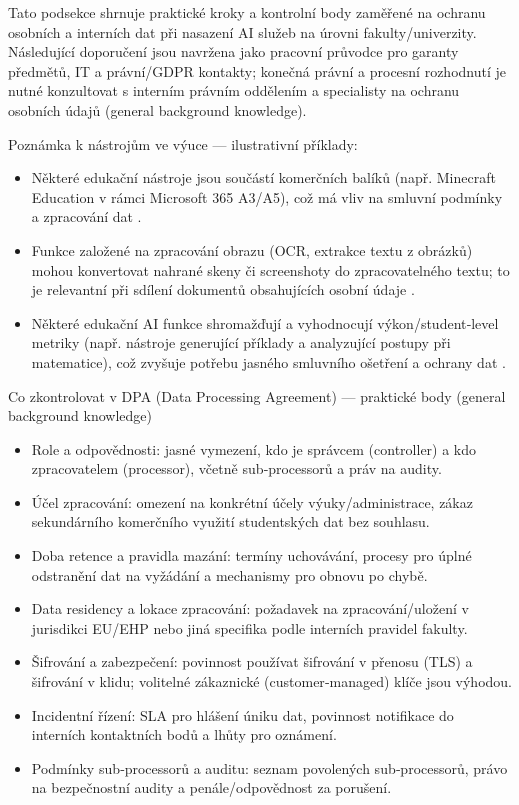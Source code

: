 Tato podsekce shrnuje praktické kroky a kontrolní body zaměřené na ochranu osobních a interních dat při nasazení AI služeb na úrovni fakulty/univerzity. Následující doporučení jsou navržena jako pracovní průvodce pro garanty předmětů, IT a právní/GDPR kontakty; konečná právní a procesní rozhodnutí je nutné konzultovat s interním právním oddělením a specialisty na ochranu osobních údajů (general background knowledge).

Poznámka k nástrojům ve výuce — ilustrativní příklady:
\begin{itemize}
  \item Některé edukační nástroje jsou součástí komerčních balíků (např. Minecraft Education v rámci Microsoft 365 A3/A5), což má vliv na smluvní podmínky a zpracování dat \cite{kb_ai_101_tipu_pdf_04e4a115_page_15_2}.
  \item Funkce založené na zpracování obrazu (OCR, extrakce textu z obrázků) mohou konvertovat nahrané skeny či screenshoty do zpracovatelného textu; to je relevantní při sdílení dokumentů obsahujících osobní údaje \cite{kb_ai_101_tipu_pdf_04e4a115_page_53_2}.
  \item Některé edukační AI funkce shromažďují a vyhodnocují výkon/student‑level metriky (např. nástroje generující příklady a analyzující postupy při matematice), což zvyšuje potřebu jasného smluvního ošetření a ochrany dat \cite{kb_ai_101_tipu_pdf_04e4a115_page_8_1}.
\end{itemize}

Co zkontrolovat v DPA (Data Processing Agreement) — praktické body (general background knowledge)
\begin{itemize}
  \item Role a odpovědnosti: jasné vymezení, kdo je správcem (controller) a kdo zpracovatelem (processor), včetně sub‑processorů a práv na audity.
  \item Účel zpracování: omezení na konkrétní účely výuky/administrace, zákaz sekundárního komerčního využití studentských dat bez souhlasu.
  \item Doba retence a pravidla mazání: termíny uchovávání, procesy pro úplné odstranění dat na vyžádání a mechanismy pro obnovu po chybě.
  \item Data residency a lokace zpracování: požadavek na zpracování/uložení v jurisdikci EU/EHP nebo jiná specifika podle interních pravidel fakulty.
  \item Šifrování a zabezpečení: povinnost používat šifrování v přenosu (TLS) a šifrování v klidu; volitelné zákaznické (customer‑managed) klíče jsou výhodou.
  \item Incidentní řízení: SLA pro hlášení úniku dat, povinnost notifikace do interních kontaktních bodů a lhůty pro oznámení.
  \item Podmínky sub‑processorů a auditu: seznam povolených sub‑processorů, právo na bezpečnostní audity a penále/odpovědnost za porušení.
\end{itemize}

